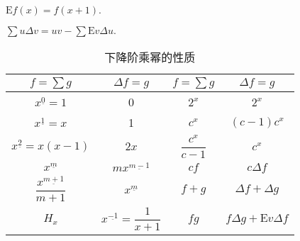 \begin{definition}
    $\mathrm{E}f(x)=f(x+1).$
\end{definition}

\begin{theorem}[分部和公式]
    $\displaystyle\sum u\varDelta v=uv-\sum\mathrm{E}v\varDelta u.$
\end{theorem}

\setcounter{magicrownumbers}{0}
\begin{table}[H]
    \centering
    \caption{下降阶乘幂的性质}
    \begin{tabular}{c c | c c}
        $f=\sum g$                         & $\varDelta f=g$                     & $f=\sum g$           & $\varDelta f=g$                       \\
        \midrule
        $x^{\underline{0}}=1$              & 0                                   & $2^{x}$              & $2^{x}$                               \\
        $x^{\underline{1}}=x$              & 1                                   & $c^{x}$              & $(c-1)c^{x}$                          \\
        $x^{\underline{2}}=x(x-1)$         & $2x$                                & $\dfrac{c^{x}}{c-1}$ & $c^x$                                 \\
        $x^{\underline{m}}$                & $mx^{\underline{m-1}}$              & $cf$                 & $c\varDelta f$                        \\
        $\dfrac{x^{\underline{m+1}}}{m+1}$ & $x^{\underline{m}}$                 & $f+g$                & $\varDelta f+\varDelta g$             \\
        $H_x$                              & $x^{\underline{-1}}=\dfrac{1}{x+1}$ & $fg$                 & $f\varDelta g+\mathrm{E}v\varDelta f$
    \end{tabular}
\end{table}

